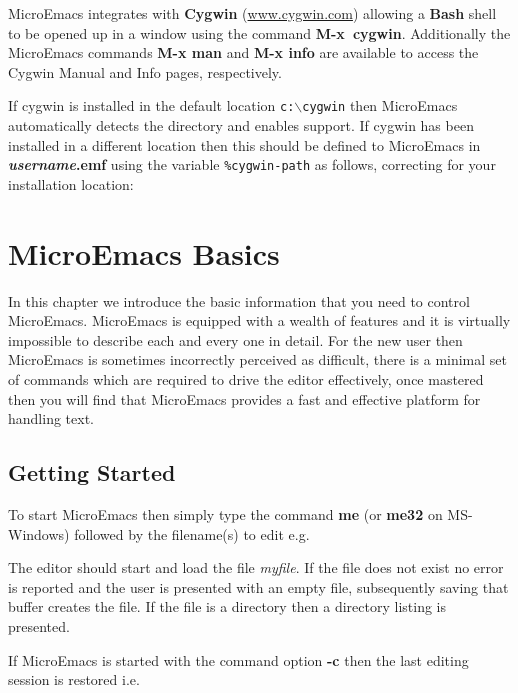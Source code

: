 \documentclass[11pt,a4paper,pdftex]{article}
\begin{document}
  MicroEmacs integrates with \textbf{Cygwin}
  (\href{http://www.cygwin.com}{www.cygwin.com}) allowing a \textbf{Bash}
  shell to be opened up in a window using the command \textbf{M-x\ cygwin}.
  Additionally the MicroEmacs commands \textbf{M-x man} and \textbf{M-x
  info} are available to access the Cygwin Manual and Info pages,
  respectively.

  If cygwin is installed in the default location \texttt{c:$\backslash$cygwin}
  then MicroEmacs automatically detects the directory and enables support. If
  cygwin has been installed in a different location then this should be
  defined to MicroEmacs in \textbf{\textit{username}.emf} using the variable
  \texttt{\%cygwin-path} as follows, correcting for your installation
  location:


\cleardoublepage
\section{MicroEmacs Basics}

  In this chapter we introduce the basic information that you need to control
  MicroEmacs. MicroEmacs is equipped with a wealth of features and it is
  virtually impossible to describe each and every one in detail. For the new
  user then MicroEmacs is sometimes incorrectly perceived as difficult, there
  is a minimal set of commands which are required to drive the editor
  effectively, once mastered then you will find that MicroEmacs provides a
  fast and effective platform for handling text.

\subsection{Getting Started}

  To start MicroEmacs then simply type the command \textbf{me} (or
  \textbf{me32} on MS-Windows) followed by the filename(s) to edit e.g.


  The editor should start and load the file \textit{myfile}. If the file does
  not exist no error is reported and the user is presented with an empty file,
  subsequently saving that buffer creates the file. If the file is a directory
  then a directory listing is presented.

  If MicroEmacs is started with the command option \textbf{-c} then the last
  editing session is restored i.e.
\end{document}
